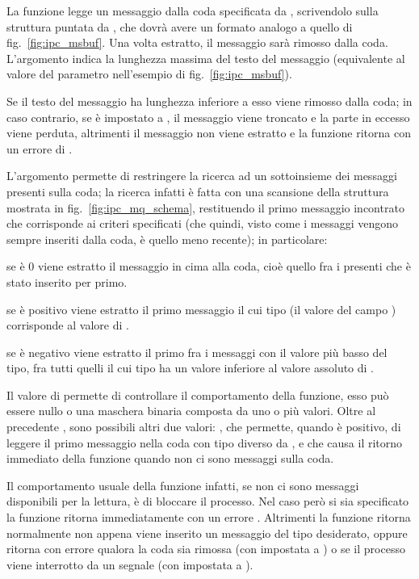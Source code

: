 La funzione legge un messaggio dalla coda specificata da ,
scrivendolo sulla struttura puntata da , che dovrà avere un
formato analogo a quello di fig.~\ref{fig:ipc_msbuf}.  Una volta estratto, il
messaggio sarà rimosso dalla coda.  L'argomento  indica la
lunghezza massima del testo del messaggio (equivalente al valore del parametro
 nell'esempio di fig.~\ref{fig:ipc_msbuf}).

Se il testo del messaggio ha lunghezza inferiore a  esso viene
rimosso dalla coda; in caso contrario, se  è impostato a
, il messaggio viene troncato e la parte in eccesso viene
perduta, altrimenti il messaggio non viene estratto e la funzione ritorna con
un errore di .

L'argomento  permette di restringere la ricerca ad un
sottoinsieme dei messaggi presenti sulla coda; la ricerca infatti è fatta con
una scansione della struttura mostrata in fig.~\ref{fig:ipc_mq_schema},
restituendo il primo messaggio incontrato che corrisponde ai criteri
specificati (che quindi, visto come i messaggi vengono sempre inseriti dalla
coda, è quello meno recente); in particolare:
\begin{itemize*}
\item se  è 0 viene estratto il messaggio in cima alla coda, cioè
  quello fra i presenti che è stato inserito per primo. 
\item se  è positivo viene estratto il primo messaggio il cui
  tipo (il valore del campo ) corrisponde al valore di
  .
\item se  è negativo viene estratto il primo fra i messaggi con
  il valore più basso del tipo, fra tutti quelli il cui tipo ha un valore
  inferiore al valore assoluto di .
\end{itemize*}

Il valore di  permette di controllare il comportamento della
funzione, esso può essere nullo o una maschera binaria composta da uno o più
valori.  Oltre al precedente , sono possibili altri due
valori: , che permette, quando  è positivo,
di leggere il primo messaggio nella coda con tipo diverso da , e
 che causa il ritorno immediato della funzione quando non
ci sono messaggi sulla coda.

Il comportamento usuale della funzione infatti, se non ci sono messaggi
disponibili per la lettura, è di bloccare il processo. Nel caso però si sia
specificato  la funzione ritorna immediatamente con un
errore . Altrimenti la funzione ritorna normalmente non appena
viene inserito un messaggio del tipo desiderato, oppure ritorna con errore
qualora la coda sia rimossa (con  impostata a ) o se
il processo viene interrotto da un segnale (con  impostata a
).

